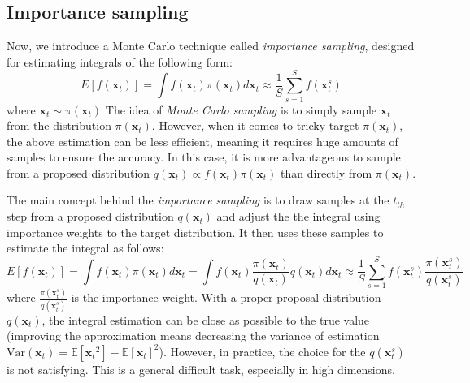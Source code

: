 \subsection{Importance sampling}
Now, we introduce a Monte Carlo technique called \textit{importance sampling}, designed for estimating integrals of the following form:
\begin{equation}
    \label{eq: MC_intergral}
    E[f(\boldsymbol{x}_{t})] = \int f(\boldsymbol{x}_{t})\pi(\boldsymbol{x}_{t}) d\boldsymbol{x}_{t}
    \approx \frac{1}{S}\sum_{s=1}^{S} f(\boldsymbol{x}_{t}^{s})
\end{equation}
where $\boldsymbol{x}_{t} \sim \pi(\boldsymbol{x}_{t})$
The idea of \textit{Monte Carlo sampling} is to simply sample $\boldsymbol{x}_{t}$ from the distribution $\pi(\boldsymbol{x}_{t})$. However, when it comes to tricky target $\pi(\boldsymbol{x}_{t})$, the above estimation can be less efficient, meaning it requires huge amounts of samples to ensure the accuracy. In this case, it is more advantageous to sample from a proposed distribution $q(\boldsymbol{x}_{t}) \propto  f(\boldsymbol{x}_{t})\pi(\boldsymbol{x}_{t})$ than directly from $\pi(\boldsymbol{x}_{t})$.

The main concept behind the \textit{importance sampling} is to draw samples at the $t_{th}$ step from a proposed distribution $q(\boldsymbol{x}_{t})$ and adjust the the integral using importance weights to the target distribution. It then uses these samples to estimate the integral as follows:
\begin{equation}
    \label{eq: IS_integral}
    E[f(\boldsymbol{x}_{t})] = \int f(\boldsymbol{x}_{t})\pi(\boldsymbol{x}_{t}) d\boldsymbol{x}_{t} = \int f(\boldsymbol{x}_{t})\frac{\pi(\boldsymbol{x}_{t})}{q(\boldsymbol{x}_{t})}q(\boldsymbol{x}_{t}) d\boldsymbol{x}_{t}
    \approx \frac{1}{S} \sum_{s=1}^{S} f(\boldsymbol{x}_{t}^{s})\frac{\pi(\boldsymbol{x}_{t}^{s})}{q(\boldsymbol{x}_{t}^{s})}
\end{equation}
where $\frac{\pi(\boldsymbol{x}_{t}^{s})}{q(\boldsymbol{x}_{t}^{s})}$ is the importance weight. With a proper proposal distribution $q(\boldsymbol{x}_{t})$, the integral estimation can be close as possible to the true value (improving the approximation means decreasing the variance of estimation $\mathrm{Var}(\boldsymbol{x}_{t}) = \mathbb{E}[{\boldsymbol{x}_{t}}^2] - {\mathbb{E}[\boldsymbol{x}_{t}]}^2$). However, in practice, the choice for the $q(\boldsymbol{x}_{t}^{s})$ is not satisfying. This is a general difficult task, especially in high dimensions.








